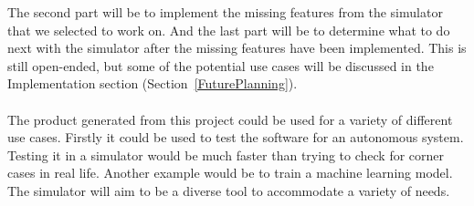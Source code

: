 The second part will be to implement the missing features from the simulator that we selected to work on.
And the last part will be to determine what to do next with the simulator after the missing features have been implemented. This is still open-ended, but some of the potential use cases will be discussed in the Implementation section (Section~\ref{FuturePlanning}).
\\~\\ 
The product generated from this project could be used for a variety of different use cases. Firstly it could be used to test the software for an autonomous system. Testing it in a simulator would be much faster than trying to check for corner cases in real life. Another example would be to train a machine learning model. The simulator will aim to be a diverse tool to accommodate a variety of needs. 
